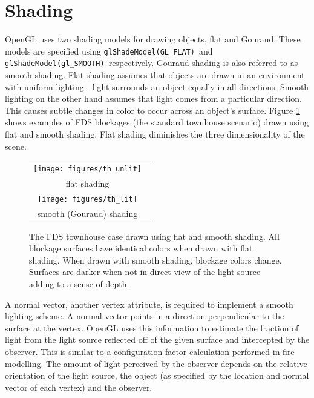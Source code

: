 \documentclass[11pt,twoside]{book}
\newcommand{\figoptions}{htp}
\begin{document}
\section{Shading} OpenGL uses two shading models for drawing
objects, flat and Gouraud.  These models are specified
using {\tt glShadeModel(GL\_FLAT)}\ and {\tt glShadeModel(gl\_SMOOTH)}\
respectively.
Gouraud shading is also
referred to as smooth shading.  Flat shading assumes that objects
are drawn in an environment with uniform lighting - light
surrounds an object equally in all directions. Smooth lighting on
the other hand assumes that light comes from a particular
direction.  This causes subtle changes in color to occur across an
object's surface. Figure \ref{figlighting} shows examples of FDS
blockages (the standard townhouse scenario) drawn using flat and
smooth shading. Flat shading diminishes the three dimensionality of
the scene.
\begin{figure}[\figoptions]
\begin{center}
\begin{tabular}{cc}
\texttt{[image: figures/th\_unlit]}\\
flat shading\\
\texttt{[image: figures/th\_lit]}\\
smooth (Gouraud) shading\\
\end{tabular}
\end{center}
\caption [The FDS townhouse case drawn using flat and smooth
shading.] { The FDS townhouse case drawn using flat and smooth
shading. All blockage surfaces have identical colors when drawn
with flat shading.  When drawn with smooth shading, blockage
colors change.  Surfaces are darker when not in direct view of the
light source adding to a sense of depth. } \label{figlighting}
\end{figure}

A normal vector, another vertex attribute, is required to
implement a smooth lighting scheme. A normal vector points in a
direction perpendicular to the surface at the vertex. OpenGL uses
this information to estimate the fraction of light from the light
source reflected off of the given surface and intercepted by the
observer.  This is similar to a configuration factor calculation
performed in fire modelling.  The amount of light perceived by the
observer depends on the relative orientation of the light source,
the object (as specified by the location and normal vector of each
vertex) and the observer.
\end{document}
